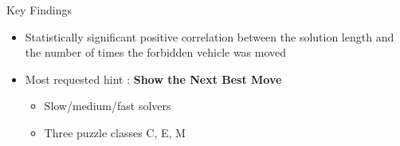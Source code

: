 \begin{frame}{Key Findings}
\begin{itemize}
\item Statistically significant positive correlation between the solution length and the number of times the forbidden vehicle was moved
\item Most requested hint : \textbf{Show the Next Best Move}
\begin{itemize}
\item Slow/medium/fast solvers
\item Three puzzle classes C, E, M
\end{itemize}
\end{itemize}
\end{frame}
